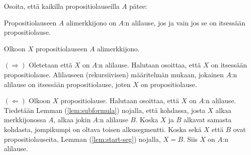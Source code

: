 \documentclass[11pt,a4paper]{amsart}
\begin{document}
\begin{exercise}[Haastetehtävä]
Osoita, että kaikilla propositiolauseilla \(A\) pätee:

Propositiolauseen \(A\) alimerkkijono on \(A\):n alilause, jos ja vain jos
se on itsessään propositiolause.
\end{exercise}

\begin{solution}
Olkoon \(X\) propositiolauseen \(A\) alimerkkijono.

\((\Longrightarrow)\) Oletetaan että \(X\) on \(A\):n alilause.
Halutaan osoittaa, että \(X\) on itsessään propositiolause.
Alilauseen (rekursiivisen) määritelmän mukaan, jokainen \(A\):n alilause on
itsessään propositiolause, joten \(X\) on propositiolause.

\((\Longleftarrow)\) Olkoon \(X\) propositiolause. Halutaan osoittaa,
että \(X\) on \(A\):n alilause. Tiedetään Lemman (\ref{lem:subformula}) nojalla,
että kohdassa, josta \(X\) alkaa merkkijonossa \(A\), alkaa jokin \(A\):n
alilause \(B\). Koska \(X\) ja \(B\) alkavat samasta kohdasta,
jompikumpi on oltava toisen alkusegmentti. Koska sekä \(X\) että \(B\) ovat
propositiolauseita, Lemman (\ref{lem:start-seg}) nojalla, \(X = B\).
Siis \(X\) on \(A\):n alilause.
\end{solution}
\end{document}

